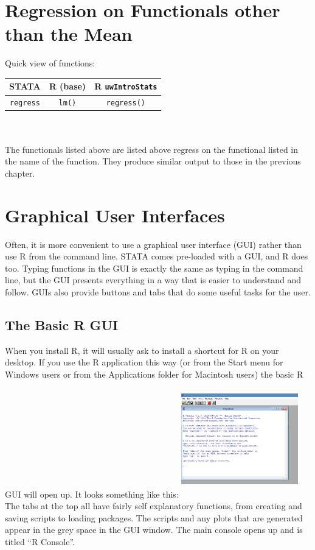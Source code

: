 \documentclass[11pt,letterpaper,fleqn]{report}
\begin{document}
\chapter{Regression on Functionals other than the Mean}
Quick view of functions:\\
\begin{tabular}{ccc}
STATA & R (base) & R \texttt{uwIntroStats}\\
\hline
\texttt{regress} & \texttt{lm()} & \texttt{regress()}\\
\end{tabular}\\
\\
The functionals listed above are listed above regress on the functional listed in the name of the function. They produce similar output to those in the previous chapter. 

\chapter{Graphical User Interfaces}
Often, it is more convenient to use a graphical user interface (GUI) rather than use R from the command line. STATA comes pre-loaded with a GUI, and R does too. Typing functions in the GUI is exactly the same as typing in the command line, but the GUI presents everything in a way that is easier to understand and follow. GUIs also provide buttons and tabs that do some useful tasks for the user.
\section{The Basic R GUI}
When you install R, it will usually ask to install a shortcut for R on your desktop. If you use the R application this way (or from the Start menu for Windows users or from the Applications folder for Macintosh users) the basic R GUI will open up. It looks something like this:
\newline
\includegraphics[width=2in, height=2in]{rgui_basic.png}
\newline 
The tabs at the top all have fairly self explanatory functions, from creating and saving scripts to loading packages. The scripts and any plots that are generated appear in the grey space in the GUI window. The main console opens up and is titled ``R Console''. 
\end{document}
